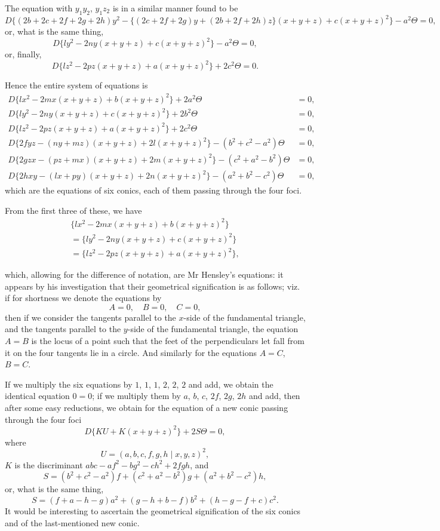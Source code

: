 \documentclass[11pt,a4paper]{article}
\begin{document}
The equation with $y_1y_2$, $y_1z_2$ is in a similar manner found to be
\[
D\{(2b+2c+2f+2g+2h)y^2 - \{(2c+2f+2g)y + (2b+2f+2h)z\}(x+y+z) + c(x+y+z)^2\} - a^2\Theta = 0,
\]
or, what is the same thing,
\[
D\{ly^2 - 2ny(x+y+z) + c(x+y+z)^2\} - a^2\Theta = 0,
\]
or, finally,
\[
D\{lz^2 - 2pz(x+y+z) + a(x+y+z)^2\} + 2c^2\Theta = 0.
\]

Hence the entire system of equations is
\begin{align*}
D\{lx^2 - 2mx(x+y+z) + b(x+y+z)^2\} + 2a^2\Theta &= 0,\\
D\{ly^2 - 2ny(x+y+z) + c(x+y+z)^2\} + 2b^2\Theta &= 0,\\
D\{lz^2 - 2pz(x+y+z) + a(x+y+z)^2\} + 2c^2\Theta &= 0,\\
D\{2fyz - (ny + mz)(x+y+z) + 2l(x+y+z)^2\} - (b^2+c^2-a^2)\Theta &= 0,\\
D\{2gzx - (pz + mx)(x+y+z) + 2m(x+y+z)^2\} - (c^2+a^2-b^2)\Theta &= 0,\\
D\{2hxy - (lx + py)(x+y+z) + 2n(x+y+z)^2\} - (a^2+b^2-c^2)\Theta &= 0,
\end{align*}
which are the equations of six conics, each of them passing through the four foci.

From the first three of these, we have
\begin{multline*}
\{lx^2 - 2mx(x+y+z) + b(x+y+z)^2\}\\
= \{ly^2 - 2ny(x+y+z) + c(x+y+z)^2\}\\
= \{lz^2 - 2pz(x+y+z) + a(x+y+z)^2\},
\end{multline*}

\newpage
\setcounter{page}{509}

which, allowing for the difference of notation, are Mr Hensley's equations: it appears by his investigation that their geometrical signification is as follows; viz. if for shortness we denote the equations by
\[
A = 0,\quad B = 0,\quad C = 0,
\]
then if we consider the tangents parallel to the $x$-side of the fundamental triangle, and the tangents parallel to the $y$-side of the fundamental triangle, the equation $A = B$ is the locus of a point such that the feet of the perpendiculars let fall from it on the four tangents lie in a circle. And similarly for the equations $A = C$, $B = C$.

If we multiply the six equations by $1$, $1$, $1$, $2$, $2$, $2$ and add, we obtain the identical equation $0 = 0$; if we multiply them by $a$, $b$, $c$, $2f$, $2g$, $2h$ and add, then after some easy reductions, we obtain for the equation of a new conic passing through the four foci
\[
D\{KU + K(x+y+z)^2\} + 2S\Theta = 0,
\]
where
\[
U = (a, b, c, f, g, h \mid x, y, z)^2,
\]
$K$ is the discriminant $abc - af^2 - bg^2 - ch^2 + 2fgh$, and
\[
S = (b^2+c^2-a^2)f + (c^2+a^2-b^2)g + (a^2+b^2-c^2)h,
\]
or, what is the same thing,
\[
S = (f+a-h-g)a^2 + (g-h+b-f)b^2 + (h-g-f+c)c^2.
\]
It would be interesting to ascertain the geometrical signification of the six conics and of the last-mentioned new conic.
\end{document}
